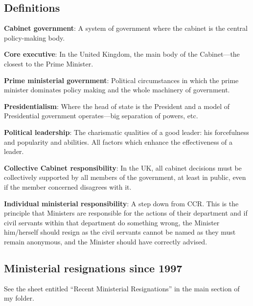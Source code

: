 \documentclass[11pt]{article}
\begin{document}
\subsection*{Definitions}

\textbf{Cabinet government}: A system of government where the cabinet is
the central policy-making body.

\textbf{Core executive}: In the United Kingdom, the main body of the
Cabinet---the closest to the Prime Minister.

\textbf{Prime ministerial government}: Political circumstances in which the
prime minister dominates policy making and the whole machinery of
government.

\textbf{Presidentialism}: Where the head of state is the President and a
model of Presidential government operates---big separation of powers, etc. 

\textbf{Political leadership}: The charismatic qualities of a good leader:
his forcefulness and popularity and abilities.  All factors which enhance
the effectiveness of a leader.

\textbf{Collective Cabinet responsibility}: In the UK, all cabinet
decisions must be collectively supported by all members of the government,
at least in public, even if the member concerned disagrees with it.

\textbf{Individual ministerial responsibility}: A step down from CCR.  This
is the principle that Ministers are responsible for the actions of their
department and if civil servants within that department do something wrong,
the Minister him\slash herself should resign as the civil servants cannot
be named as they must remain anonymous, and the Minister should have
correctly advised.

\subsection*{Ministerial resignations since 1997}

See the sheet entitled ``Recent Ministerial Resignations'' in the main
section of my folder.
\end{document}
